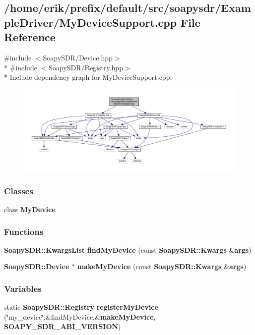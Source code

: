 \subsection{/home/erik/prefix/default/src/soapysdr/\+Example\+Driver/\+My\+Device\+Support.cpp File Reference}
\label{MyDeviceSupport_8cpp}
{\ttfamily \#include $<$Soapy\+S\+D\+R/\+Device.\+hpp$>$}\\*
{\ttfamily \#include $<$Soapy\+S\+D\+R/\+Registry.\+hpp$>$}\\*
Include dependency graph for My\+Device\+Support.\+cpp\+:
\nopagebreak
\begin{figure}[H]
\begin{center}
\leavevmode
\includegraphics[width=350pt]{d7/d49/MyDeviceSupport_8cpp__incl}
\end{center}
\end{figure}
\subsubsection*{Classes}
\begin{DoxyCompactItemize}
\item 
class {\bf My\+Device}
\end{DoxyCompactItemize}
\subsubsection*{Functions}
\begin{DoxyCompactItemize}
\item 
{\bf Soapy\+S\+D\+R\+::\+Kwargs\+List} {\bf find\+My\+Device} (const {\bf Soapy\+S\+D\+R\+::\+Kwargs} \&{\bf args})
\item 
{\bf Soapy\+S\+D\+R\+::\+Device} $\ast$ {\bf make\+My\+Device} (const {\bf Soapy\+S\+D\+R\+::\+Kwargs} \&{\bf args})
\end{DoxyCompactItemize}
\subsubsection*{Variables}
\begin{DoxyCompactItemize}
\item 
static {\bf Soapy\+S\+D\+R\+::\+Registry} {\bf register\+My\+Device} (\char`\"{}my\+\_\+device\char`\"{},\&find\+My\+Device,\&{\bf make\+My\+Device}, {\bf S\+O\+A\+P\+Y\+\_\+\+S\+D\+R\+\_\+\+A\+B\+I\+\_\+\+V\+E\+R\+S\+I\+ON})
\end{DoxyCompactItemize}


